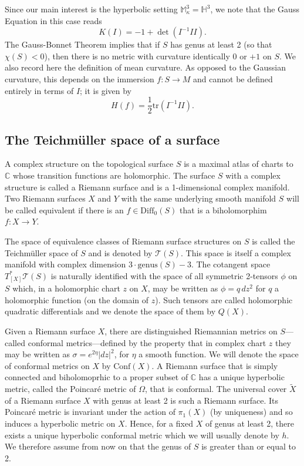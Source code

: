 \documentclass{amsart}
\newcommand{\C}{\mathbb{C}}
\renewcommand{\H}{\mathbb{H}}
\newcommand{\two}{I\!\!I}
\begin{document}
Since our main interest is the hyperbolic setting $\mathbb{M}_\kappa^3 = \H^3$, we note that the Gauss Equation in this case reads
\[
K(I) = -1 + \det(I^{-1}\two).
\]
The Gauss-Bonnet Theorem implies that if $S$ has genus at least 2 (so that $\chi(S) < 0$), then there is no metric with curvature identically 0 or $+1$ on $S$.
We also record here the definition of mean curvature. 
As opposed to the Gaussian curvature, this depends on the immersion $f: S \to M$ and cannot be defined entirely in terms of $I$; it is given by 
\[
H(f) = \frac{1}{2} \mathrm{tr}(I^{-1}\two).
\]



\subsection{The Teichm\"uller space of a surface}



A complex structure on the topological surface $S$ is a maximal atlas of charts to $\C$ whose transition functions are holomorphic. 
The surface $S$ with a complex structure is called a Riemann surface and is a 1-dimensional complex manifold. 
Two Riemann surfaces $X$ and $Y$ with the same underlying smooth manifold $S$ will be called equivalent if there is an $f \in \mathrm{Diff}_0(S)$ that is a biholomorphim $f: X \to Y$. 

The space of equivalence classes of Riemann surface structures on $S$ is called the Teichm\"uller space of $S$ and is denoted by $\mathcal{T}(S)$. 
This space is itself a complex manifold with complex dimension $3\cdot \text{genus}(S) - 3$. 
The cotangent space $T^*_{[X]}\mathcal{T}(S)$ is naturally identified with the space of all symmetric 2-tensors $\phi$ on $S$ which, in a holomorphic chart $z$ on $X$, may be written as $\phi = q \, dz^2$ for $q$ a holomorphic function (on the domain of $z$). 
Such tensors are called holomorphic quadratic differentials and we denote the space of them by $Q(X)$. 

Given a Riemann surface $X$, there are distinguished Riemannian metrics on $S$---called conformal metrics---defined by the property that in complex chart $z$  they may be written as $\sigma = e^{2\eta} |dz|^2$, for $\eta$ a smooth function. 
We will denote the space of conformal metrics on $X$ by $\mathrm{Conf}(X)$. 
A Riemann surface that is simply connected and biholomoprhic to a proper subset of $\C$ has a unique hyperbolic metric, called the Poincar\'e metric of $\Omega$, that is conformal. 
The universal cover $\tilde{X}$ of a Riemann surface $X$ with genus at least 2 is such a Riemann surface. 
Its Poincar\'e metric is invariant under the action of $\pi_1(X)$ (by uniqueness) and so induces a hyperbolic metric on $X$. Hence, for a fixed $X$ of genus at least 2, there exists a unique hyperbolic conformal metric which we will usually denote by $h$. 
We therefore assume from now on that the genus of $S$ is greater than or equal to 2. 
\end{document}
